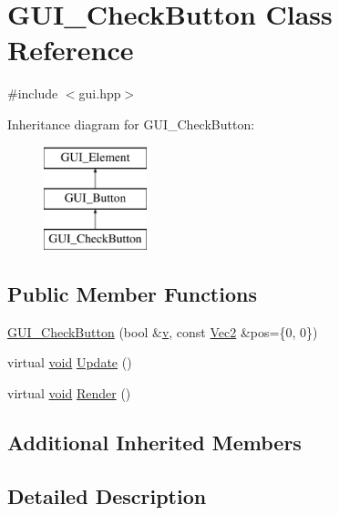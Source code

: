 \hypertarget{class_g_u_i___check_button}{\section{G\-U\-I\-\_\-\-Check\-Button Class Reference}
\label{class_g_u_i___check_button}
}


{\ttfamily \#include $<$gui.\-hpp$>$}

Inheritance diagram for G\-U\-I\-\_\-\-Check\-Button\-:\begin{figure}[H]
\begin{center}
\leavevmode
\includegraphics[height=3.000000cm]{class_g_u_i___check_button}
\end{center}
\end{figure}
\subsection*{Public Member Functions}
\begin{DoxyCompactItemize}
\item 
\hyperlink{class_g_u_i___check_button_aba6479582920de3b7637b6c1c55ed5e9}{G\-U\-I\-\_\-\-Check\-Button} (bool \&\hyperlink{_s_d_l__opengl_8h_a10a82eabcb59d2fcd74acee063775f90}{v}, const \hyperlink{class_vec2}{Vec2} \&pos=\{0, 0\})
\item 
virtual \hyperlink{_s_d_l__opengles2__gl2ext_8h_ae5d8fa23ad07c48bb609509eae494c95}{void} \hyperlink{class_g_u_i___check_button_ae1904db9a44fb764357a0d4aab53b994}{Update} ()
\item 
virtual \hyperlink{_s_d_l__opengles2__gl2ext_8h_ae5d8fa23ad07c48bb609509eae494c95}{void} \hyperlink{class_g_u_i___check_button_a614090bd8dba2c68b1a780fc44a7c590}{Render} ()
\end{DoxyCompactItemize}
\subsection*{Additional Inherited Members}


\subsection{Detailed Description}



